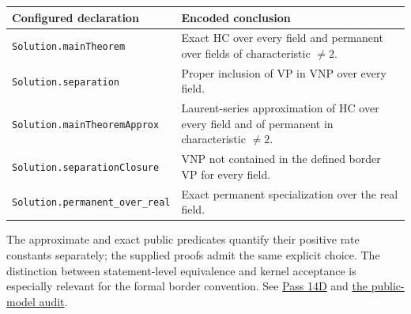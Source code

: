 \documentclass[11pt,letterpaper]{article}
\theoremstyle{definition}\newtheorem{definition}[theorem]{Definition}\newtheorem{example}[theorem]{Example}
\theoremstyle{remark}\newtheorem{remark}[theorem]{Remark}
\newcommand{\aud}[2]{\href{https://github.com/nousentllc/VP-VNP-Review/blob/567303d0bcf4f9d54390437b137752446e58ccd6/#1}{#2}}
\begin{document}
\begin{center}
\begin{tabular}{@{}p{.36\linewidth}p{.54\linewidth}@{}}\toprule
Configured declaration & Encoded conclusion \\\midrule
\texttt{Solution.mainTheorem} & Exact HC over every field and permanent over fields of characteristic $\ne2$.\\
\texttt{Solution.separation} & Proper inclusion of VP in VNP over every field.\\
\texttt{Solution.mainTheoremApprox} & Laurent-series approximation of HC over every field and of permanent in characteristic $\ne2$.\\
\texttt{Solution.separationClosure} & VNP not contained in the defined border VP for every field.\\
\texttt{Solution.permanent\_over\_real} & Exact permanent specialization over the real field.\\
\bottomrule\end{tabular}
\end{center}
The approximate and exact public predicates quantify their positive rate constants separately; the supplied proofs admit the same explicit choice. The distinction between statement-level equivalence and kernel acceptance is especially relevant for the formal border convention. See \aud{passes/14d-formal.md}{Pass 14D} and \aud{passes/statement-correspondence.md}{the public-model audit}.
\end{document}
